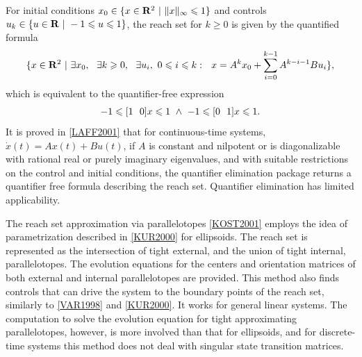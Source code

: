 \documentclass[letterpaper,10pt,english]{sphinxmanual}
\begin{document}
For initial conditions \(x_0\in\{x\in {\bf R}^2 ~|~ \|x\|_{\infty} \leqslant1\}\) and
controls \(u_k\in\{u\in {\bf R} ~|~ -1\leqslant u\leqslant1\}\), the
reach set for \(k\geqslant0\) is given by the quantified formula
\begin{gather}
\begin{split}\{ x\in{\bf R}^2 ~|~ \exists x_0, ~~ \exists k\geqslant0, ~~
\exists u_i, ~ 0\leqslant i\leqslant k: ~~
x = A^kx_0+\sum_{i=0}^{k-1}A^{k-i-1}Bu_i \},\end{split}\notag
\end{gather}
which is equivalent to the quantifier-free expression
\begin{gather}
\begin{split}-1\leqslant[1 ~~ 0]x\leqslant1 ~ \wedge ~ -1\leqslant[0 ~~ 1]x\leqslant1.\end{split}\notag
\end{gather}
It is proved in {\hyperref[chap_intro:laff2001]{{[}LAFF2001{]}}} that for
continuous-time systems, \(\dot{x}(t) = Ax(t) + Bu(t)\), if
\(A\) is constant and nilpotent or is diagonalizable with rational
real or purely imaginary eigenvalues, and with suitable restrictions on
the control and initial conditions, the quantifier elimination package
returns a quantifier free formula describing the reach set. Quantifier
elimination has limited applicability.

The reach set approximation via parallelotopes {\hyperref[chap_intro:kost2001]{{[}KOST2001{]}}} employs
the idea of parametrization described in {\hyperref[chap_intro:kur2000]{{[}KUR2000{]}}}
for ellipsoids. The reach set is represented as the intersection of
tight external, and the union of tight internal, parallelotopes. The
evolution equations for the centers and orientation matrices of both
external and internal parallelotopes are provided. This method also
finds controls that can drive the system to the boundary points of the
reach set, similarly to {\hyperref[chap_intro:var1998]{{[}VAR1998{]}}} and {\hyperref[chap_intro:kur2000]{{[}KUR2000{]}}}.
It works for general linear systems. The computation to solve
the evolution equation for tight approximating parallelotopes, however,
is more involved than that for ellipsoids, and for discrete-time systems
this method does not deal with singular state transition matrices.
\end{document}
